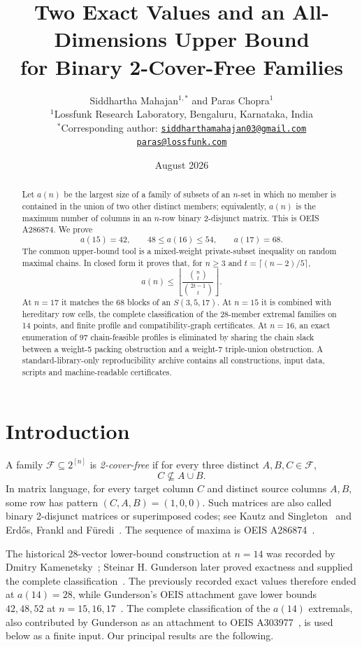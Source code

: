 \documentclass[11pt]{article}
\title{Two Exact Values and an All-Dimensions Upper Bound\\
for Binary 2-Cover-Free Families}
\author{
Siddhartha Mahajan$^{1,*}$ and Paras Chopra$^{1}$\\[5pt]
\small $^{1}$Lossfunk Research Laboratory, Bengaluru, Karnataka, India\\[4pt]
\scriptsize $^{*}$Corresponding author:
\href{mailto:siddharthamahajan03@gmail.com}{\texttt{siddharthamahajan03@gmail.com}}\\[2pt]
\scriptsize
\href{mailto:paras@lossfunk.com}{\texttt{paras@lossfunk.com}}
}
\date{August 2026}
\newcommand{\F}{\mathcal F}
\begin{document}
\setlength{\emergencystretch}{1.5em}
\maketitle

\begin{abstract}
Let $a(n)$ be the largest size of a family of subsets of an $n$-set in
which no member is contained in the union of two other distinct members;
equivalently, $a(n)$ is the maximum number of columns in an $n$-row binary
2-disjunct matrix.  This is OEIS A286874.  We prove
\[
 a(15)=42,\qquad 48\leq a(16)\leq54,\qquad a(17)=68.
\]
The common upper-bound tool is a mixed-weight private-subset inequality on
random maximal chains.  In closed form it proves that, for $n\geq3$ and
$t=\lceil(n-2)/5\rceil$,
\[
 a(n)\leq
 \left\lfloor\frac{\binom nt}{\binom{2t-1}t}\right\rfloor.
\]
At $n=17$ it matches the 68 blocks of an
$S(3,5,17)$.  At $n=15$ it is combined with hereditary row cells, the
complete classification of the 28-member extremal families on 14 points,
and finite profile and compatibility-graph certificates.  At $n=16$, an
exact enumeration of 97 chain-feasible profiles is eliminated by sharing the
chain slack between a weight-5 packing obstruction and a weight-7
triple-union obstruction.  A standard-library-only reproducibility archive
contains all constructions, input data, scripts and machine-readable
certificates.
\end{abstract}

\section{Introduction}

A family $\F\subseteq 2^{[n]}$ is \emph{2-cover-free} if for every three
distinct $A,B,C\in\F$,
\[
 C\nsubseteq A\cup B.
\]
In matrix language, for every target column $C$ and distinct source columns
$A,B$, some row has pattern $(C,A,B)=(1,0,0)$.  Such matrices are also called
binary 2-disjunct matrices or superimposed codes; see Kautz and
Singleton~\cite{kautz-singleton} and Erd\H{o}s, Frankl and
F\"uredi~\cite{eff1982}.  The sequence of maxima is OEIS
A286874~\cite{oeis-a286874}.

The historical 28-vector lower-bound construction at $n=14$ was recorded by
Dmitry Kamenetsky~\cite{kamenetsky-a286874}; Steinar H. Gunderson later proved
exactness and supplied the complete classification~\cite{oeis-a303977}.  The
previously recorded exact values therefore ended at $a(14)=28$, while
Gunderson's OEIS attachment gave lower bounds $42,48,52$ at
$n=15,16,17$~\cite{gunderson-a286874}.  The complete classification of the
$a(14)$ extremals, also contributed by Gunderson as an attachment to OEIS
A303977~\cite{oeis-a303977}, is used below as a finite input.  Our principal
results are the following.
\end{document}
